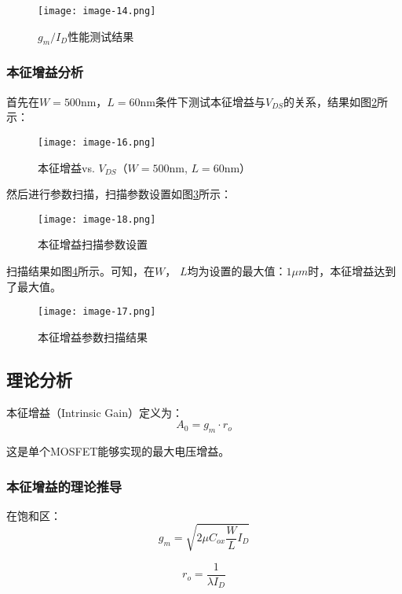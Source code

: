 \documentclass[UTF8,12pt,a4paper]{ctexart}
\begin{document}
\begin{figure}[h]
\centering
\texttt{[image: image-14.png]}
\caption{$g_m/I_D$性能测试结果}
\label{fig:task7b}
\end{figure}


\subsubsection{本征增益分析}
首先在$W=500$nm，$L=60$nm条件下测试本征增益与$V_{DS}$的关系，结果如图\ref{fig:task7c}所示：

\begin{figure}[h]
\centering
\texttt{[image: image-16.png]}
\caption{本征增益vs. $V_{DS}$（$W=500$nm, $L=60$nm）}
\label{fig:task7c}
\end{figure}

然后进行参数扫描，扫描参数设置如图\ref{fig:task7d}所示：

\begin{figure}[h]
\centering
\texttt{[image: image-18.png]}
\caption{本征增益扫描参数设置}
\label{fig:task7d}
\end{figure}

扫描结果如图\ref{fig:task7e}所示。可知，在$W$， $L$均为设置的最大值：$1\mu m$时，本征增益达到了最大值。

\begin{figure}[h]
\centering
\texttt{[image: image-17.png]}
\caption{本征增益参数扫描结果}
\label{fig:task7e}
\end{figure}

\subsection{理论分析}
本征增益（Intrinsic Gain）定义为：
\begin{equation}
A_0 = g_m \cdot r_o
\end{equation}

这是单个MOSFET能够实现的最大电压增益。

\subsubsection{本征增益的理论推导}
在饱和区：
\begin{equation}
g_m = \sqrt{2\mu C_{ox}\frac{W}{L}I_D}
\end{equation}

\begin{equation}
r_o = \frac{1}{\lambda I_D}
\end{equation}
\end{document}
